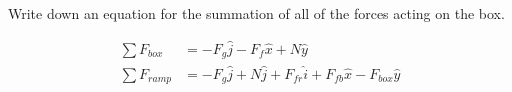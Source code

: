 Write down an equation for the summation of all of the forces acting on the box.

\begin{solution}
\begin{align*}
    \sum F_{box}&=-F_{g} \hat{j}-F_{f} \hat{x}+N \hat{y} \\
    \sum F_{ramp}&=-F_{g} \hat{j}+N \hat{j}+F_{fr} \hat{i}+F_{fb} \hat{x}-F_{box} \hat{y}
\end{align*}
\end{solution}